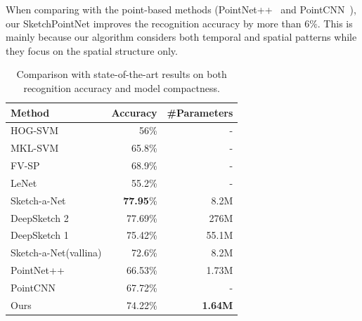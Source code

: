 When comparing with the point-based methods (PointNet++~\cite{qi2017pointnetplusplus} and PointCNN~\cite{1801.07791}), our SketchPointNet improves the recognition accuracy by more than $6\%$.
This is mainly because our algorithm considers both temporal and spatial patterns while they focus on the spatial structure only.



\begin{table}[htbp]
\centering
\caption{Comparison with state-of-the-art results on both recognition accuracy and model compactness.}
\label{tb:acc-size}
\begin{tabular}{l|rr}
    \hline
     Method & Accuracy & \#Parameters\\
    \hline
     HOG-SVM \cite{Eitz2012HowDH}& 56\% & - \\
     MKL-SVM \cite{LiHSG15} & 65.8\%  & - \\
     FV-SP \cite{Schneider2014SketchCA} & 68.9\%  & -\\
     LeNet \cite{LeCun1998GradientbasedLA}& 55.2\%  & -\\
     \hline
     Sketch-a-Net \cite{Yu2015SketchaNetTB}& \textbf{77.95}\%  & 8.2M\\
     DeepSketch 2 \cite{Dupont2016DeepSketch2D}& 77.69\%  & 276M\\
     \hline
     DeepSketch 1 \cite{Seddati2015DeepSketchDC}& 75.42\%  & 55.1M\\
     Sketch-a-Net(vallina) \cite{Yu2015SketchaNetTB}& 72.6\% & 8.2M \\
     \hline
     PointNet++ \cite{qi2017pointnetplusplus}& 66.53\%  & 1.73M\\
     PointCNN \cite{1801.07791}& 67.72\%  & -\\
     Ours& 74.22\%  & \textbf{1.64M}\\
    \hline
\end{tabular}
\end{table}



